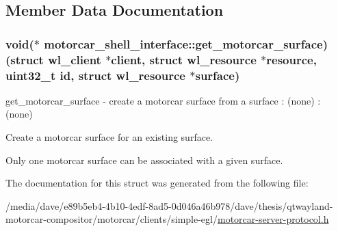 \subsection{Member Data Documentation}
\hypertarget{structmotorcar__shell__interface_a48c566c33704d3f369f3768bae578f19}{
\subsubsection[{get\-\_\-motorcar\-\_\-surface}]{\setlength{\rightskip}{0pt plus 5cm}void($\ast$ motorcar\-\_\-shell\-\_\-interface\-::get\-\_\-motorcar\-\_\-surface)(struct wl\-\_\-client $\ast$client, struct wl\-\_\-resource $\ast$resource, uint32\-\_\-t id, struct wl\-\_\-resource $\ast${\bf surface})}}\label{structmotorcar__shell__interface_a48c566c33704d3f369f3768bae578f19}
get\-\_\-motorcar\-\_\-surface -\/ create a motorcar surface from a surface \-: (none) \-: (none)

Create a motorcar surface for an existing surface.

Only one motorcar surface can be associated with a given surface. 

The documentation for this struct was generated from the following file\-:\begin{DoxyCompactItemize}
\item 
/media/dave/e89b5eb4-\/4b10-\/4edf-\/8ad5-\/0d046a46b978/dave/thesis/qtwayland-\/motorcar-\/compositor/motorcar/clients/simple-\/egl/\hyperlink{clients_2simple-egl_2motorcar-server-protocol_8h}{motorcar-\/server-\/protocol.\-h}\end{DoxyCompactItemize}
